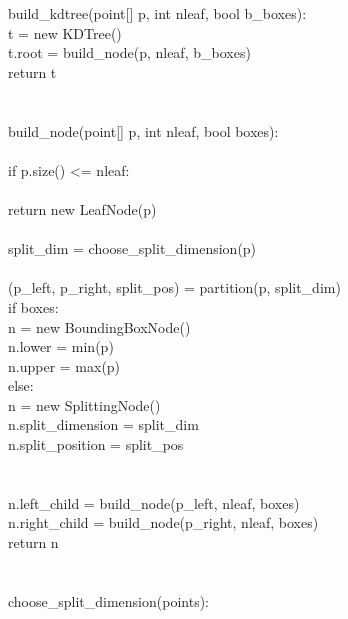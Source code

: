 \begin{figure}
\begin{pcode}
  \func build\_kdtree(point[] p, int nleaf, bool b\_boxes): \\
  \> t = new KDTree() \\
  \> t.root = build\_node(p, nleaf, b\_boxes) \\
  \> return t \\
  \\
   \\
  \func build\_node(point[] p, int nleaf, bool boxes): \\
  \>  \\
  \> if p.size() <= nleaf: \\
  \>\>  \\
  \>\> return new LeafNode(p) \\
  \>  \\
  \> split\_dim = choose\_split\_dimension(p) \\
  \>  \\
  \> (p\_left, p\_right, split\_pos) = partition(p, split\_dim) \\
  \> if boxes: \\
  \>\> n = new BoundingBoxNode() \\
  \>\> n.lower = min(p) \\
  \>\> n.upper = max(p) \\
  \> else: \\
  \>\> n = new SplittingNode() \\
  \>\> n.split\_dimension = split\_dim \\
  \>\>  n.split\_position = split\_pos \\
  \>  \\
  \>  \\
  \> n.left\_child \spc = build\_node(p\_left, \spc nleaf, boxes) \\
  \> n.right\_child = build\_node(p\_right, nleaf, boxes) \\
  \> return n \\
  \\
   \\
  \func choose\_split\_dimension(points): \\

\end{pcode}
\end{figure}

